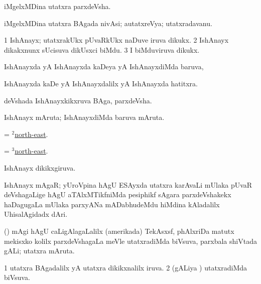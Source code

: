 \bentry
{}
\gl{\nA}
\bmng
iMgelxMDina utatxra parxdeVsha. 
\emng
\eentry

\bentry
{}
\gl{\nA}
\bmng
iMgelxMDina utatxra BAgada nivAsi; autatxreVya; utatxradavanu. 
\emng
\eentry

\bentry
{}
\gl{\nA}
\bmng
\bnum
\num{1} IshAnayx; utatxrakUkx pUvaRkUkx naDuve iruva dikukx. 
\num{2} IshAnayx dikakxnunx sUcisuva dikUsxci biMdu. 
\num{3} I biMduviruva dikukx. 
\enum
\emng
\eentry

\bentry
{}
\gl{\gu}
\bmng
IshAnayxda yA IshAnayxda kaDeya yA IshAnayxdiMda baruva, 
\emng
\eentry

\bentry
{}
\gl{\kirxvi}
\bmng
IshAnayxda kaDe yA IshAnayxdalilx yA IshAnayxda hatitxra. 
\emng
\eentry

\bentry
{}
\gl{\nA}
\bmng
deVshada IshAnayxkikxruva BAga, parxdeVsha. 
\emng
\eentry

\bentry
{}
\gl{\nA}
\bmng
IshAnayx mAruta; IshAnayxdiMda baruva mAruta. 
\emng
\eentry

\bentry
{}
\gl{\gu}
\bmng
= \hyperlink{north-east(2)}{$^2$north-east}. 
\emng
\eentry

\bentry
{}
\gl{\kirxvi}
\bmng
= \hyperlink{north-east(3)}{$^3$north-east}. 
\emng
\eentry

\bentry
{}
\gl{\gu}
\bmng
IshAnayx dikikxgiruva. 
\emng
\eentry

\bentry
{}
\gl{\nA}
\bmng
IshAnayx mAgaR; yUroVpina hAgU ESAyxda utatxra karAvaLi mUlaka pUvaR deVshagaLige hAgU aTAlxMTikfniMda pesiphikf sAgara parxdeVshakekx haDagugaLa mUlaka parxyANa mADabhudeMdu hiMdina kAladalilx UhisalAgidadx dAri. 
\emng
\eentry

\bentry
{}
\gl{\nA}
\bmng
(\ame) mAgi hAgU caLigAlagaLalilx (amerikada) TekAsxsf, phAlxriDa matutx mekisxko kolilx parxdeVshagaLa meVle utatxradiMda biVsuva, parxbala shiVtada gALi; utatxra mAruta. 
\emng
\eentry

\bentry
{}
\gl{\gu}
\bmng
\bnum
\num{1} utatxra BAgadalilx yA utatxra dikikxnalilx iruva. 
\num{2} (gALiya \vi) utatxradiMda biVsuva. 
\enum
\emng
\eentry

